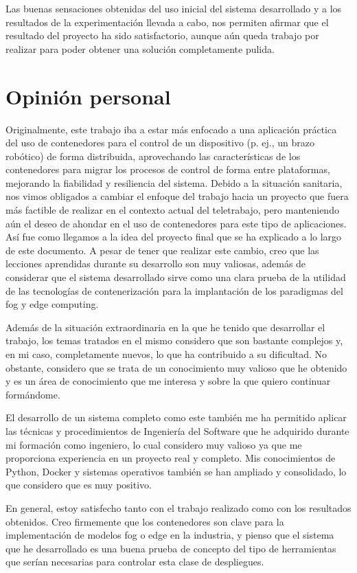 Las buenas sensaciones obtenidas del uso inicial del sistema desarrollado y a
los resultados de la experimentación llevada a cabo, nos permiten afirmar que el
resultado del proyecto ha sido satisfactorio, aunque aún queda trabajo por
realizar para poder obtener una solución completamente pulida.

\section{Opinión personal}

Originalmente, este trabajo iba a estar más enfocado a una aplicación práctica
del uso de contenedores para el control de un dispositivo (p. ej., un brazo
robótico) de forma distribuida, aprovechando las características de los
contenedores para migrar los procesos de control de forma entre plataformas,
mejorando la fiabilidad y resiliencia del sistema. Debido a la situación
sanitaria, nos vimos obligados a cambiar el enfoque del trabajo hacia un
proyecto que fuera más factible de realizar en el contexto actual del
teletrabajo, pero manteniendo aún el deseo de ahondar en el uso de contenedores
para este tipo de aplicaciones. Así fue como llegamos a la idea del proyecto
final que se ha explicado a lo largo de este documento. A pesar de tener que
realizar este cambio, creo que las lecciones aprendidas durante su desarrollo
son muy valiosas, además de considerar que el sistema desarrollado sirve como
una clara prueba de la utilidad de las tecnologías de contenerización para la
implantación de los paradigmas del fog y edge computing.

Además de la situación extraordinaria en la que he tenido que desarrollar el
trabajo, los temas tratados en el mismo considero que son bastante complejos y,
en mi caso, completamente nuevos, lo que ha contribuido a su dificultad. No
obstante, considero que se trata de un conocimiento muy valioso que he obtenido
y es un área de conocimiento que me interesa y sobre la que quiero continuar
formándome.

El desarrollo de un sistema completo como este también me ha permitido
aplicar las técnicas y procedimientos de Ingeniería del Software que he
adquirido durante mi formación como ingeniero, lo cual considero muy valioso ya
que me proporciona experiencia en un proyecto real y completo. Mis conocimientos
de Python, Docker y sistemas operativos también se han ampliado y consolidado,
lo que considero que es muy positivo.

En general, estoy satisfecho tanto con el trabajo realizado como con los
resultados obtenidos. Creo firmemente que los contenedores son clave para la
implementación de modelos fog o edge en la industria, y pienso que el sistema
que he desarrollado es una buena prueba de concepto del tipo de herramientas que
serían necesarias para controlar esta clase de despliegues.

